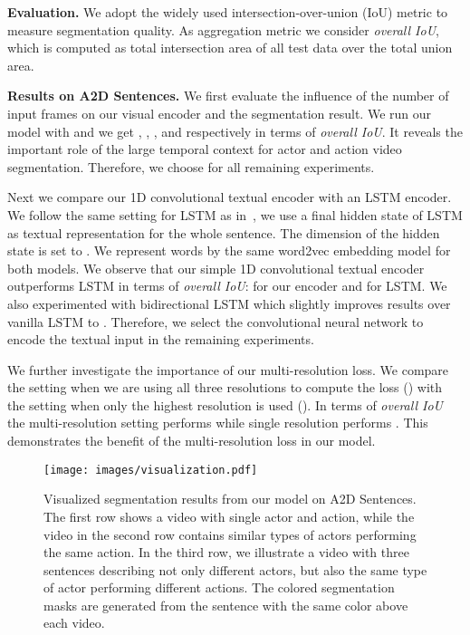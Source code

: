 \textbf{Evaluation.} We adopt the widely used intersection-over-union (IoU) metric to measure segmentation quality. As aggregation metric we consider \textit{overall IoU}, which is computed as total intersection area of all test data over the total union area.

\textbf{Results on A2D Sentences.} We first evaluate the influence of the number of input frames on our visual encoder and the segmentation result. We run our model with  and we get , , , and  respectively in terms of \textit{overall IoU}. It reveals the important role of the large temporal context for actor and action video segmentation. Therefore, we choose  for all remaining experiments.

Next we compare our 1D convolutional textual encoder with an LSTM encoder. We follow the same setting for LSTM as in~\cite{hu2016segmentation,li2017tracking}, we use a final hidden state of LSTM as textual representation for the whole sentence. The dimension of the hidden state is set to . We represent words by the same word2vec embedding model for both models. We observe that our simple 1D convolutional textual encoder outperforms LSTM in terms of \textit{overall IoU}:  for our encoder and  for LSTM. We also experimented with bidirectional LSTM which slightly improves results over vanilla LSTM to . Therefore, we select the convolutional neural network to encode the textual input in the remaining experiments.

We further investigate the importance of our multi-resolution loss. We compare the setting when we are using all three resolutions to compute the loss () with the setting when only the highest resolution is used (). In terms of \textit{overall IoU} the multi-resolution setting performs  while single resolution performs . This demonstrates the benefit of the multi-resolution loss in our model.

\begin{figure*}[t!]
    \centering 
    \texttt{[image: images/visualization.pdf]} 
    \caption{Visualized segmentation results from our model on A2D Sentences. The first row shows a video with single actor and action, while the video in the second row contains similar types of actors performing the same action. In the third row, we illustrate a video with three sentences describing not only different actors, but also the same type of actor performing different actions. The colored segmentation masks are generated from the sentence with the same color above each video.}
    \label{fig:visualization}
\end{figure*}

